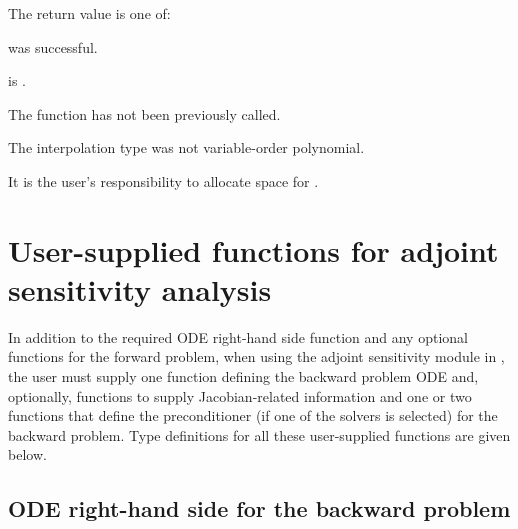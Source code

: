 {
  The return value  is one of:
  \begin{args}
  \item[\Id{CV\_SUCCESS}] 
     was successful.
  \item[\Id{CV\_MEM\_NULL}] 
     is .
  \item[\Id{CV\_NO\_ADJ}]
    The function  has not been previously called.
  \item[\Id{CV\_ILL\_INPUT}]
    The interpolation type was not variable-order polynomial.
  \end{args}
}
{
  It is the user's responsibility to allocate space for .
}

\section{User-supplied functions for adjoint sensitivity analysis}
\label{ss:user_fct_adj}

In addition to the required ODE right-hand side function and any optional functions
for the forward problem, when using the adjoint sensitivity module in {\cvodes},
the user must supply one function defining the backward problem ODE and, optionally,
functions to supply Jacobian-related information and one or two functions 
that define the preconditioner (if one of the {\cvspils} solvers is
selected) for the backward problem.
Type definitions for all these user-supplied functions are given below.

\subsection{ODE right-hand side for the backward problem}


